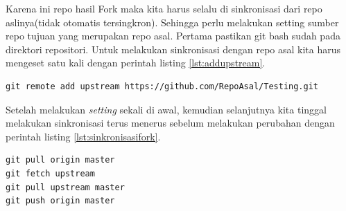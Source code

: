 Karena ini repo hasil Fork maka kita harus selalu di sinkronisasi dari repo aslinya(tidak otomatis tersingkron). Sehingga perlu melakukan setting sumber repo tujuan yang merupakan repo asal. Pertama pastikan git bash sudah pada direktori repositori. Untuk melakukan sinkronisasi dengan repo asal kita harus mengeset satu kali dengan perintah listing \ref{lst:addupstream}.

\begin{lstlisting}[caption=Set Repo Asal Sebagai Upstream,label={lst:addupstream}]
git remote add upstream https://github.com/RepoAsal/Testing.git
\end{lstlisting}


Setelah melakukan \textit{setting} sekali di awal, kemudian selanjutnya kita tinggal melakukan sinkronisasi terus menerus sebelum melakukan perubahan dengan perintah listing \ref{lst:sinkronisasifork}.

\begin{lstlisting}[caption=Perintah Sinkronisasi dengan repo asal,label={lst:sinkronisasifork}]
git pull origin master
git fetch upstream
git pull upstream master
git push origin master
\end{lstlisting}


